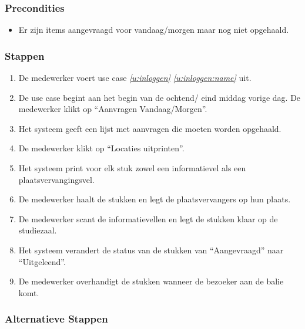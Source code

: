 \documentclass[a4paper,titlepage]{report}
\def\namedref#1{\ref{#1} \ref{#1:name}}
\begin{document}
      \subsubsection{Precondities}
        \begin{itemize}
          \item Er zijn items aangevraagd voor vandaag/morgen maar nog niet
          opgehaald.
        \end{itemize}
      \subsubsection{Stappen}
        \begin{enumerate}
          \item De medewerker voert use case \textit{\namedref{u:inloggen}}
            uit.
          \item De use case begint aan het begin van de ochtend/ eind middag
            vorige dag. De medewerker klikt op ``Aanvragen Vandaag/Morgen''.
          \item Het systeem geeft een lijst met aanvragen die moeten worden
            opgehaald.
          \item De medewerker klikt op ``Locaties uitprinten''.
          \item Het systeem print voor elk stuk zowel een informatievel als
            een plaatsvervangingsvel.
          \item \label{u:aanvragen-ophalen:ophalen} De medewerker haalt de
            stukken en legt de plaatsvervangers op hun plaats.
          \item De medewerker scant de
            informatievellen en legt de stukken
            klaar op de studiezaal.
          \item \label{u:aanvragen-ophalen:scannen} Het systeem verandert de
            status van de stukken van
            ``Aangevraagd'' naar ``Uitgeleend''.
          \item \label{u:aanvragen-ophalen:balie} De medewerker overhandigt de
            stukken wanneer de bezoeker aan
            de balie komt.
 
        \end{enumerate}
      \subsubsection{Alternatieve Stappen}
\end{document}
